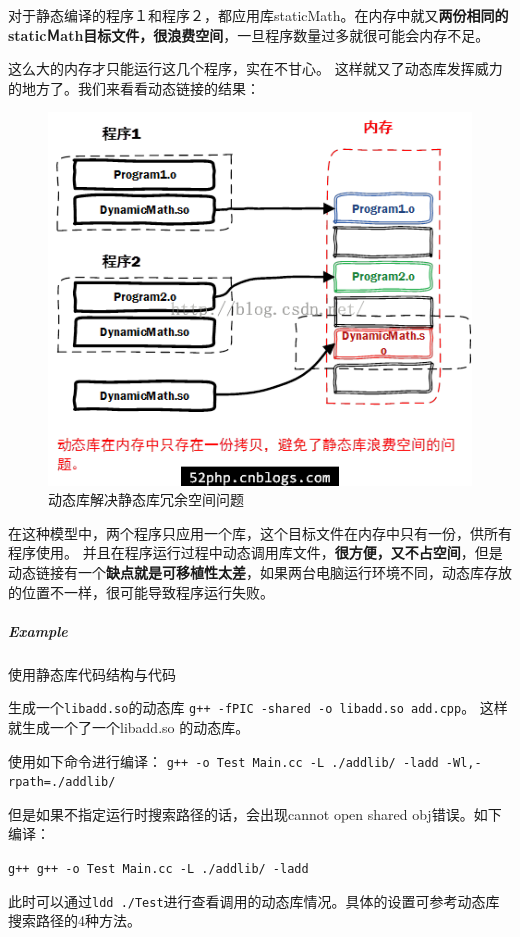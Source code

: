 \documentclass[UTF8,a4paper,12pt]{ctexbook}
\begin{document}
			对于静态编译的程序１和程序２，都应用库staticMath。在内存中就又\textbf{两份相同的staticＭath目标文件，很浪费空间}，一旦程序数量过多就很可能会内存不足。
			
			这么大的内存才只能运行这几个程序，实在不甘心。
			这样就又了动态库发挥威力的地方了。我们来看看动态链接的结果：
			
			\begin{figure}[h]
				\centering
				\includegraphics[scale = 0.7]{figure/dynamicLib.png}
				\caption{动态库解决静态库冗余空间问题}
			\end{figure}

			在这种模型中，两个程序只应用一个库，这个目标文件在内存中只有一份，供所有程序使用。
			并且在程序运行过程中动态调用库文件，\textbf{很方便，又不占空间}，但是动态链接有一个\textbf{缺点就是可移植性太差}，如果两台电脑运行环境不同，动态库存放的位置不一样，很可能导致程序运行失败。
			
			\subparagraph{Example}使用静态库代码结构与代码
			
			生成一个\verb|libadd.so|的动态库
			\verb|g++ -fPIC -shared -o libadd.so add.cpp|。
			这样就生成一个了一个libadd.so 的动态库。
			
			
			使用如下命令进行编译：
			\verb|g++ -o Test Main.cc -L ./addlib/ -ladd -Wl,-rpath=./addlib/|
			
			但是如果不指定运行时搜索路径的话，会出现cannot open shared obj错误。如下编译：
			
			\verb|g++ g++ -o Test Main.cc -L ./addlib/ -ladd|
			
			此时可以通过\verb|ldd ./Test|进行查看调用的动态库情况。具体的设置可参考动态库搜索路径的4种方法。
			
\end{document}
